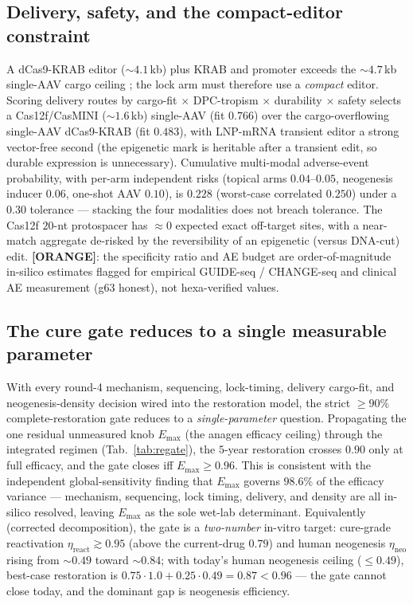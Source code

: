 \documentclass[11pt,a4paper]{article}
\newcommand{\tierbadge}[2]{\textcolor{#1}{\textbf{[#2]}}}
\providecommand{\tierOrange}{\tierbadge{orange!80!black}{ORANGE}}
\begin{document}
\subsection{Delivery, safety, and the compact-editor constraint}
\label{sec:deliver}
A dCas9-KRAB editor ($\sim\!4.1$\,kb) plus KRAB and promoter exceeds the
$\sim\!4.7$\,kb single-AAV cargo ceiling \citep{wu2010}; the lock arm must therefore use
a \emph{compact} editor. Scoring delivery routes by cargo-fit $\times$ DPC-tropism
$\times$ durability $\times$ safety selects a Cas12f/CasMINI ($\sim\!1.6$\,kb) single-AAV
(fit $0.766$) over the cargo-overflowing single-AAV dCas9-KRAB (fit $0.483$), with
LNP-mRNA transient editor a strong vector-free second (the epigenetic mark is heritable
after a transient edit, so durable expression is unnecessary). Cumulative multi-modal
adverse-event probability, with per-arm independent risks (topical arms $0.04$--$0.05$,
neogenesis inducer $0.06$, one-shot AAV $0.10$), is $0.228$ (worst-case correlated
$0.250$) under a $0.30$ tolerance --- stacking the four modalities does not breach
tolerance. The Cas12f $20$-nt protospacer has $\approx\!0$ expected exact off-target
sites, with a near-match aggregate de-risked by the reversibility of an epigenetic
(versus DNA-cut) edit. \tierOrange: the specificity ratio and AE budget are
order-of-magnitude in-silico estimates flagged for empirical GUIDE-seq / CHANGE-seq and
clinical AE measurement (g63 honest), not hexa-verified values.

\subsection{The cure gate reduces to a single measurable parameter}
\label{sec:regate}
With every round-4 mechanism, sequencing, lock-timing, delivery cargo-fit, and
neogenesis-density decision wired into the restoration model, the strict $\geq\!90\%$
complete-restoration gate reduces to a \emph{single-parameter} question. Propagating the
one residual unmeasured knob $E_{\max}$ (the anagen efficacy ceiling) through the
integrated regimen (Tab.~\ref{tab:regate}), the $5$-year restoration crosses $0.90$ only
at full efficacy, and the gate closes iff $E_{\max}\geq 0.96$. This is consistent with
the independent global-sensitivity finding that $E_{\max}$ governs $98.6\%$ of the
efficacy variance --- mechanism, sequencing, lock timing, delivery, and density are all
in-silico resolved, leaving $E_{\max}$ as the sole wet-lab determinant. Equivalently
(corrected decomposition), the gate is a \emph{two-number} in-vitro target: cure-grade
reactivation $\eta_{\text{react}}\gtrsim 0.95$ (above the current-drug $0.79$) and human
neogenesis $\eta_{\text{neo}}$ rising from $\sim\!0.49$ toward $\sim\!0.84$; with today's
human neogenesis ceiling ($\leq\!0.49$), best-case restoration is
$0.75\!\cdot\!1.0+0.25\!\cdot\!0.49=0.87<0.96$ --- the gate cannot close today, and the
dominant gap is neogenesis efficiency.
\end{document}
